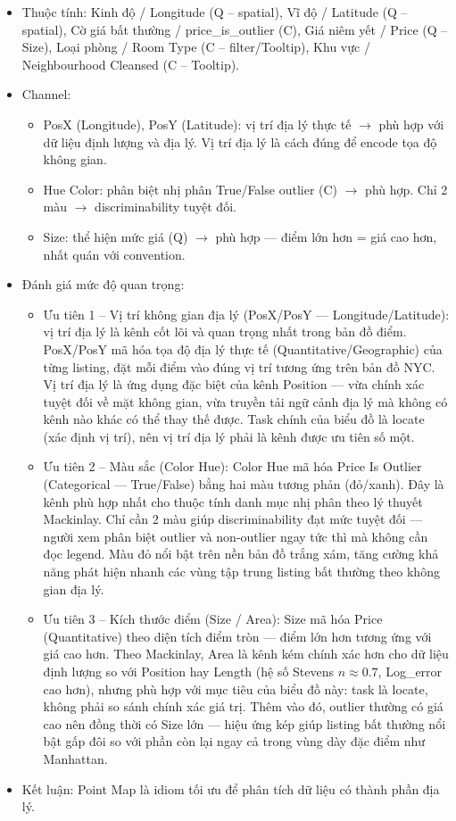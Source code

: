 \begin{itemize}
    \item Thuộc tính: Kinh độ / Longitude (Q -- spatial), Vĩ độ / Latitude (Q -- spatial), Cờ giá bất thường / price\_is\_outlier (C), Giá niêm yết / Price (Q -- Size), Loại phòng / Room Type (C -- filter/Tooltip), Khu vực / Neighbourhood Cleansed (C -- Tooltip).
    \item Channel:
    \begin{itemize}
        \item PosX (Longitude), PosY (Latitude): vị trí địa lý thực tế $\rightarrow$ phù hợp với dữ liệu định lượng và địa lý. Vị trí địa lý là cách đúng để encode tọa độ không gian.
        \item Hue Color: phân biệt nhị phân True/False outlier (C) $\rightarrow$ phù hợp. Chỉ 2 màu $\rightarrow$ discriminability tuyệt đối.
        \item Size: thể hiện mức giá (Q) $\rightarrow$ phù hợp --- điểm lớn hơn = giá cao hơn, nhất quán với convention.
    \end{itemize}
    \item Đánh giá mức độ quan trọng:
    \begin{itemize}
        \item Ưu tiên 1 -- Vị trí không gian địa lý (PosX/PosY --- Longitude/Latitude): vị trí địa lý là kênh cốt lõi và quan trọng nhất trong bản đồ điểm. PosX/PosY mã hóa tọa độ địa lý thực tế (Quantitative/Geographic) của từng listing, đặt mỗi điểm vào đúng vị trí tương ứng trên bản đồ NYC. Vị trí địa lý là ứng dụng đặc biệt của kênh Position --- vừa chính xác tuyệt đối về mặt không gian, vừa truyền tải ngữ cảnh địa lý mà không có kênh nào khác có thể thay thế được. Task chính của biểu đồ là locate (xác định vị trí), nên vị trí địa lý phải là kênh được ưu tiên số một.
        \item Ưu tiên 2 -- Màu sắc (Color Hue): Color Hue mã hóa Price Is Outlier (Categorical --- True/False) bằng hai màu tương phản (đỏ/xanh). Đây là kênh phù hợp nhất cho thuộc tính danh mục nhị phân theo lý thuyết Mackinlay. Chỉ cần 2 màu giúp discriminability đạt mức tuyệt đối --- người xem phân biệt outlier và non-outlier ngay tức thì mà không cần đọc legend. Màu đỏ nổi bật trên nền bản đồ trắng xám, tăng cường khả năng phát hiện nhanh các vùng tập trung listing bất thường theo không gian địa lý.
        \item Ưu tiên 3 -- Kích thước điểm (Size / Area): Size mã hóa Price (Quantitative) theo diện tích điểm tròn --- điểm lớn hơn tương ứng với giá cao hơn. Theo Mackinlay, Area là kênh kém chính xác hơn cho dữ liệu định lượng so với Position hay Length (hệ số Stevens $n \approx 0.7$, Log\_error cao hơn), nhưng phù hợp với mục tiêu của biểu đồ này: task là locate, không phải so sánh chính xác giá trị. Thêm vào đó, outlier thường có giá cao nên đồng thời có Size lớn --- hiệu ứng kép giúp listing bất thường nổi bật gấp đôi so với phần còn lại ngay cả trong vùng dày đặc điểm như Manhattan.
    \end{itemize}
    \item Kết luận: Point Map là idiom tối ưu để phân tích dữ liệu có thành phần địa lý.
\end{itemize}

